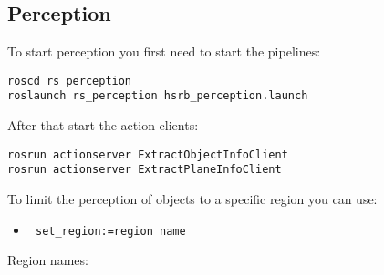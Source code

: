 \documentclass[main.tex]{subfiles}
\begin{document}
	\subsection{Perception}

	To start perception you first need to start the pipelines:
	\begin{lstlisting}
roscd rs_perception
roslaunch rs_perception hsrb_perception.launch
\end{lstlisting}	

After that start the action clients:
\begin{lstlisting}
rosrun actionserver ExtractObjectInfoClient
rosrun actionserver ExtractPlaneInfoClient
\end{lstlisting}

To limit the perception of objects to a specific region you can use:
\begin{itemize}
\item \begin{verbatim} set_region:=region name \end{verbatim} 
\end{itemize}
Region names:
\end{document}
